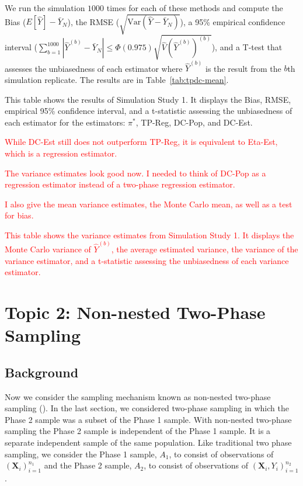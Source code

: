 \documentclass[12pt]{article}
\newcommand{\Var}{{\text{Var}}}
\renewcommand{\bf}[1]{\mathbf{#1}}
\begin{document}
We run the simulation $1000$ times for each of these methods and compute the
Bias ($E[\hat Y] - \bar Y_N$), the RMSE ($\sqrt{\Var(\hat Y - \bar Y_N)}$), a 95\%
empirical confidence interval ($\sum_{b = 1}^{1000} |\hat Y^{(b)} - \bar Y_N| \leq 
\Phi(0.975)\sqrt{\hat V(\hat Y^{(b)})^{(b)}}$), and a T-test that assesses the
unbiasedness of each estimator where $\hat Y^{(b)}$ is the result from the $b$th
simulation replicate. The results are in Table~\ref{tab:tpdc-mean}.

\begin{table}[ht!]
  \centering

\caption{This table shows the results of Simulation Study 1. It displays the
Bias, RMSE, empirical 95\% confidence interval, and a t-statistic assessing the
unbiasedness of each estimator for the estimators: $\pi^*$, TP-Reg, DC-Pop, and
DC-Est.}
\label{tab:tpdc-mean}
\end{table}

\textcolor{red}{While DC-Est still does not outperform TP-Reg, it is equivalent
to Eta-Est, which is a regression estimator.}

\textcolor{red}{The variance estimates look good now. I needed to think of
DC-Pop as a regression estimator instead of a two-phase regression estimator.}

\textcolor{red}{I also give the mean variance estimates, the Monte Carlo mean,
as well as a test for bias.}
\begin{table}[ht!]
  \centering
{\color{red}  }
\caption{\textcolor{red}{This table shows the variance estimates from Simulation
    Study 1. It displays the Monte Carlo variance of $\hat Y^{(b)}$, the average
    estimated variance, the variance of the variance estimator, and a
    t-statistic assessing the unbiasedness of each variance estimator.}}
\label{tab:tpdc-var}
\end{table}


\section{Topic 2: Non-nested Two-Phase Sampling}

\subsection{Background}

Now we consider the sampling mechanism known as non-nested two-phase sampling 
(\cite{hidiroglou2001double}). In the last section, we considered two-phase sampling
in which the Phase 2 sample was a subset of the Phase 1 sample. With non-nested
two-phase sampling the Phase 2 sample is independent of the Phase 1 sample. It
is a separate independent sample of the same population. Like traditional two
phase sampling, we consider the Phase 1 sample, $A_1$, to consist of
observations of $(\bf X_i)_{i = 1}^{n_1}$ and the Phase 2 sample, $A_2$, to consist
of observations of $(\bf X_i, Y_i)_{i = 1}^{n_2}$. 
\end{document}
